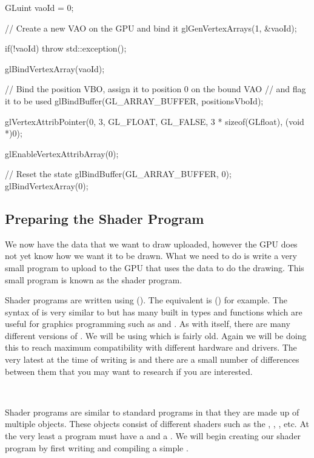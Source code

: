 \documentclass[10pt]{article}
\begin{document}
\begin{Code}
  GLuint vaoId = 0;

  // Create a new VAO on the GPU and bind it
  glGenVertexArrays(1, &vaoId);

  if(!vaoId)
  {
    throw std::exception();
  }

  glBindVertexArray(vaoId);

  // Bind the position VBO, assign it to position 0 on the bound VAO
  // and flag it to be used
  glBindBuffer(GL_ARRAY_BUFFER, positionsVboId);

  glVertexAttribPointer(0, 3, GL_FLOAT, GL_FALSE,
    3 * sizeof(GLfloat), (void *)0);

  glEnableVertexAttribArray(0);

  // Reset the state
  glBindBuffer(GL_ARRAY_BUFFER, 0);
  glBindVertexArray(0);
\end{Code}


\subsection*{Preparing the Shader Program}
We now have the data that we want to draw uploaded, however the GPU does
not yet know how we want it to be drawn. What we need to do is write
a very small program to upload to the GPU that uses the data to do the
drawing. This small program is known as the shader program.

Shader programs are written using 
(). The  equivalent is  () for example.  The syntax of 
is very similar to  but has many built in types and functions
which are useful for graphics programming such as  and
. As with  itself, there are many different
versions of . We will be using  which is fairly
old. Again we will be doing this to reach maximum compatibility with
different hardware and drivers. The very latest at the time of writing
is  and there are a small number of differences
between them that you may want to research if you are interested.

\

Shader programs are similar to standard  programs in that
they are made up of multiple objects. These objects consist of different
shaders such as the , ,
, etc. At the very least a program must have a
 and a . We will begin creating
our shader program by first writing and compiling a simple .
\end{document}

